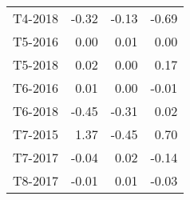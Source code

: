 \begin{tabular}{lrrr}
     T4-2018 &                    -0.32 &                   -0.13 &                     -0.69 \\
     T5-2016 &                     0.00 &                    0.01 &                      0.00 \\
     T5-2018 &                     0.02 &                    0.00 &                      0.17 \\
     T6-2016 &                     0.01 &                    0.00 &                     -0.01 \\
     T6-2018 &                    -0.45 &                   -0.31 &                      0.02 \\
     T7-2015 &                     1.37 &                   -0.45 &                      0.70 \\
     T7-2017 &                    -0.04 &                    0.02 &                     -0.14 \\
     T8-2017 &                    -0.01 &                    0.01 &                     -0.03 \\
\bottomrule
\end{tabular}

